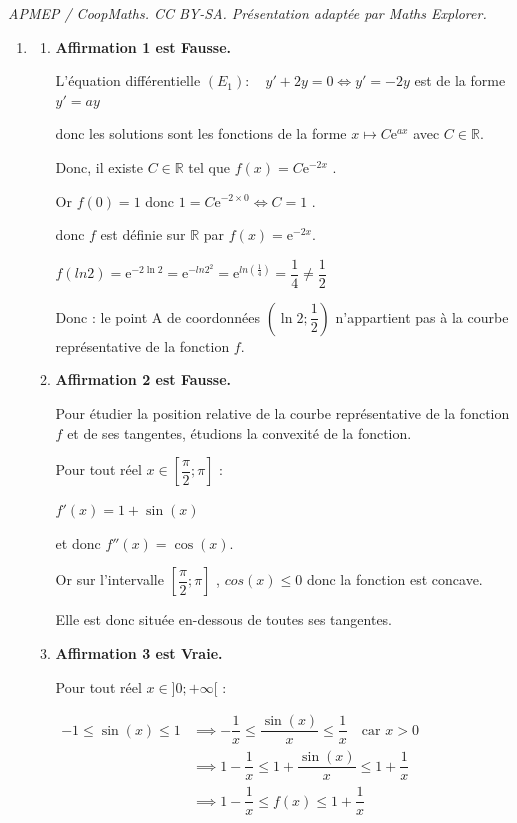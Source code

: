 \documentclass[10pt]{article}
\providecommand{\R}{\mathbb{R}}
\providecommand{\e}{{\mathrm{e}}}
\begin{document}
\noindent\textit{APMEP / CoopMaths. CC BY-SA. Présentation adaptée par Maths Explorer.}\par\medskip
\begin{enumerate}
\item 
	\begin{enumerate}
	\item  	\textbf{Affirmation 1  est Fausse. } 
	
	L'équation différentielle \quad $\left(E_{1}\right): \quad y'+2 y=0 \iff y'=-2y$ est de la forme $y'=ay$ 
	
donc les  solutions sont les fonctions de la forme $x\mapsto C\e^{ax}$ avec $C\in\R$. 

Donc, il existe $C\in \R$ tel que $f(x)= C \e^{-2x}$ .

Or $f(0)=1$ donc $1=C\e^{-2\times 0} \iff C=1$ .

donc $f$ est définie sur $\R$ par $f(x)=\e^{-2x}$. 

$f(ln 2) = \e^{-2\ln 2} = \e^{ -ln 2^2}= \e^{ln \left(\frac{1}{4}\right)}= \dfrac{1}{4} \neq \dfrac{1}{2}$

Donc : le point A de coordonnées $\left(\ln 2 ; \dfrac{1}{2}\right)$ n'appartient pas à la courbe représentative de la fonction $f$.



	\item	\textbf{Affirmation 2  est  Fausse. } 
	
Pour étudier la position relative de la courbe représentative de la fonction $f$ et de ses tangentes, étudions la convexité de la fonction. 

Pour tout réel $x\in \left[\dfrac{\pi}{2} ; \pi\right]$  : 

$f'(x) = 1 + \sin(x)$ 

et donc   $f''(x)= \cos(x)$.

Or sur l'intervalle $\left[\dfrac{\pi}{2} ; \pi\right]$ , $cos(x) \leq 0$ donc la fonction est concave. 

Elle est donc située en-dessous de toutes ses tangentes. 





	\item 	\textbf{Affirmation 3  est  Vraie. }
	
	
	Pour tout réel  $x\in ] 0 ;+\infty[$ : 
	
	$\begin{aligned}
		-1 \leqslant \sin(x) \leqslant 1 &\implies  -\dfrac{1}{x} \leqslant  \dfrac{\sin (x)}{x} \leqslant \dfrac{1}{x}  \quad \text{car } x>0 \\
	&	\implies  1 -\dfrac{1}{x} \leqslant  1 + \dfrac{\sin (x)}{x} \leqslant 1 +\dfrac{1}{x}  \\
	&	\implies  1 -\dfrac{1}{x} \leqslant  f(x)  \leqslant 1 +\dfrac{1}{x}  \\
	\end{aligned}$
	

\end{enumerate}
\end{enumerate}
\end{document}
